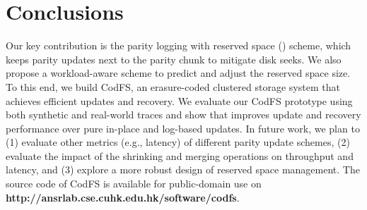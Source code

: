 \chapter{Conclusions}
\label{sec:conclusion}

Our key contribution is the parity logging with reserved space (\PLR) scheme,
which keeps parity updates next to the parity chunk to mitigate disk seeks. We
also propose a workload-aware scheme to predict and adjust the reserved space
size.  To this end, we build CodFS, an erasure-coded clustered storage system
that achieves efficient updates and recovery.  We evaluate our CodFS prototype
using both synthetic and real-world traces and show that \PLR improves update
and recovery performance over pure in-place and log-based updates.  In future
work, we plan to (1) evaluate other metrics (e.g., latency) of different parity
update schemes, (2) evaluate the impact of the shrinking and merging
operations on throughput and latency, and (3) explore a more robust design of
reserved space management.  The source code of CodFS is available for
public-domain use on {\bf http://ansrlab.cse.cuhk.edu.hk/software/codfs}. 

